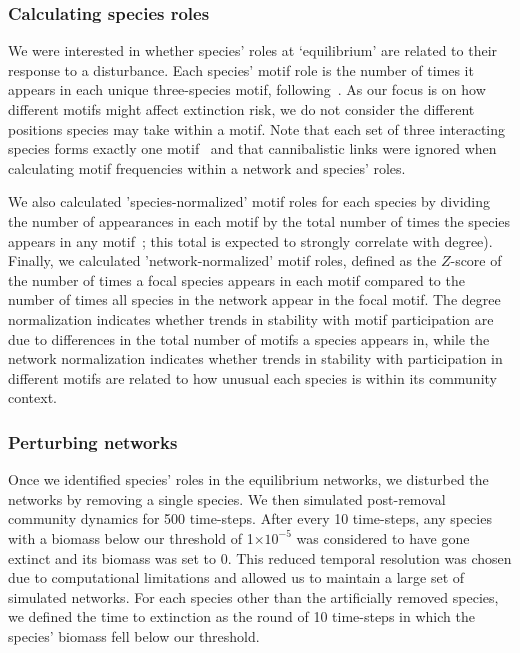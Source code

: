 \documentclass[12pt]{article}
\begin{document}
\begin{spacing}{2.0}
    
    	\subsubsection*{Calculating species roles}
    
    
    		We were interested in whether species' roles at `equilibrium' are related to their response to a disturbance. 
            Each species' motif role is the number of times it appears in each unique three-species motif, following~\citet{Stouffer2012,Cirtwill2015}. 
            As our focus is on how different motifs might affect extinction risk, we do not consider the different positions species may take within a motif.   
            Note that each set of three interacting species forms exactly one motif~\citep{Cirtwill2018FoodWebs} and that cannibalistic links were ignored when calculating motif frequencies within a network and species' roles. 


            We also calculated 'species-normalized' motif roles for each species by dividing the number of appearances in each motif by the total number of times the species appears in any motif~\citep{Cirtwill2015}; this total is expected to strongly correlate with degree). 
            Finally, we calculated 'network-normalized' motif roles, defined as the $Z$-score of the number of times a focal species appears in each motif compared to the number of times all species in the network appear in the focal motif.
    		The degree normalization indicates whether trends in stability with motif participation are due to differences in the total number of motifs a species appears in, while the network normalization indicates whether trends in stability with participation in different motifs are related to how unusual each species is within its community context.
    
    
    	\subsubsection*{Perturbing networks}
    
    		Once we identified species' roles in the equilibrium networks, we disturbed the networks by removing a single species. 
            We then simulated post-removal community dynamics for 500 time-steps.
            After every 10 time-steps, any species with a biomass below our threshold of 1$\times10^{-5}$ was considered to have gone extinct and its biomass was set to 0.
            This reduced temporal resolution was chosen due to computational limitations and allowed us to maintain a large set of simulated networks.
            For each species other than the artificially removed species, we defined the time to extinction as the round of 10 time-steps in which the species' biomass fell below our threshold. 



\end{spacing}
\end{document}
